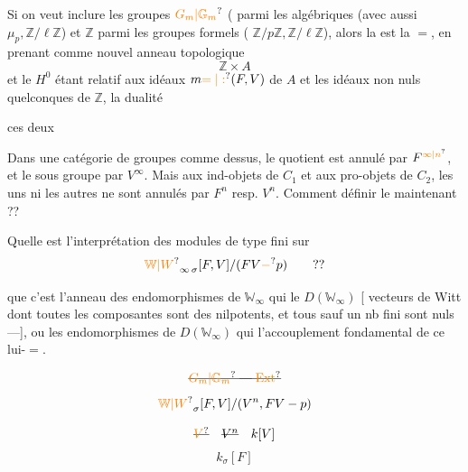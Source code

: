 Si on veut inclure les groupes $\unsure{G_m|\mathbb G_m}$ ( parmi les algébriques (avec aussi $\mu_p,\mathbb Z/\ell\mathbb Z$) et $\mathbb Z$ parmi les groupes formels ( $\mathbb Z/p\mathbb Z,\mathbb Z/\ell\mathbb Z$), alors la  est la $=$, en prenant comme nouvel anneau topologique
\[\mathbb Z\times A\]
et le $H^0$ étant relatif aux idéaux $m\unsure{=|:}(F,V)$ de $A$ et les idéaux non nuls quelconques de $\mathbb Z$, la dualité

 ces deux 

Dans une catégorie de groupes comme dessus, le quotient est  annulé par $F^{\unsure{\infty|n}}$, et le sous groupe par $V^\infty$. Mais  aux ind-objets de $C_1$ et aux pro-objets de $C_2$, les uns ni les autres ne sont annulés par $F^n$ resp. $V^n$. Comment définir le  maintenant ??

Quelle est l'interprétation des modules de type fini sur
\[\unsure{\mathbb W|W}_{\infty\,\sigma}[F,V]/(FV\unsure{-}p)\qquad ??\]

 que c'est l'anneau des endomorphismes de $\mathbb W_\infty$ qui  le  $D(\mathbb W_\infty)$ [ vecteurs de Witt dont toutes les composantes sont des nilpotents, et tous sauf un nb fini sont nuls ---], ou les endomorphismes de $D(\mathbb W_\infty)$ qui  l'accouplement fondamental de ce   lui-$=$.

\[\deleted{\unsure{G_m|\mathbb G_m}\;\text{---}\;\unsure{\operatorname{Ext}}}\]
\[\unsure{\mathbb W|W}_\sigma[F,V]/(V^n,FV-p)\]

\[\deleted{\unsure{V}}\quad\deleted{V^n}\quad k[V]\]
\[k_\sigma[F]\]

